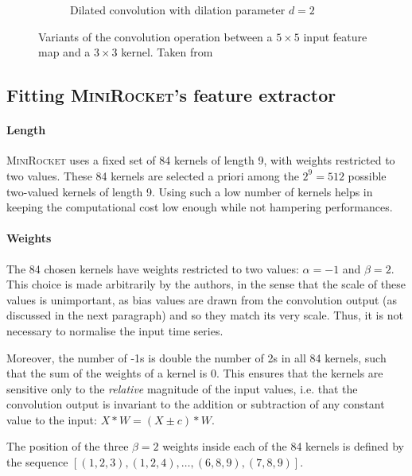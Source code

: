 \begin{figure}[htb!]
\begin{subfigure}[t]{0.45\textwidth}
    \caption[Dilated convolution]{Dilated convolution with dilation parameter $d=2$}
    \label{fig:dilated_conv}
\end{subfigure}
\caption[Variants of the convolution operation]{Variants of the convolution operation between a $5\times5$ input feature map and a $3\times3$ kernel. Taken from \cite{conv_variants_fig}}
\label{fig:conv_variants}
\end{figure}



\subsection{Fitting \textsc{MiniRocket}'s feature extractor}
\label{sec:minirocket_feat_extr}


\paragraph{Length}
\textsc{MiniRocket} uses a fixed set of 84 kernels of length 9, with weights restricted to two values. These 84 kernels are selected a priori among the $2^9=512$ possible two-valued kernels of length 9. Using such a low number of kernels helps in keeping the computational cost low enough while not hampering performances.


\paragraph{Weights}
The 84 chosen kernels have weights restricted to two values: $\alpha=-1$ and $\beta=2$. This choice is made arbitrarily by the authors, in the sense that the scale of these values is unimportant, as bias values are drawn from the convolution output (as discussed in the next paragraph) and so they match its very scale. Thus, it is not necessary to normalise the input time series.

Moreover, the number of -1s is double the number of 2s in all 84 kernels, such that the sum of the weights of a kernel is 0. This ensures that the kernels are sensitive only to the \textit{relative} magnitude of the input values, i.e. that the convolution output is invariant to the addition or subtraction of any constant value to the input: $X*W = (X\pm c)*W$.

The position of the three $\beta=2$ weights inside each of the 84 kernels is defined by the sequence $[(1,2,3), (1,2,4), \dots, (6,8,9), (7,8,9)]$.


